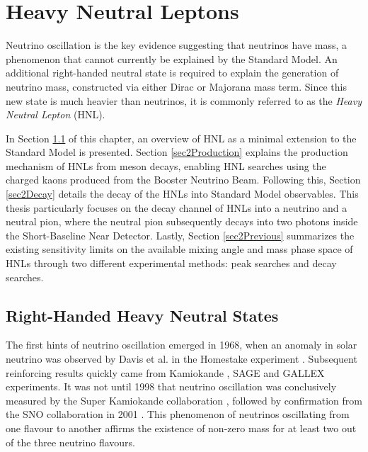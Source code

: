 
\chapter{Heavy Neutral Leptons}

\ifpdf
    \graphicspath{{Chapter2/Figs/Raster/}{Chapter2/Figs/PDF/}{Chapter2/Figs/}}
\else
    \graphicspath{{Chapter2/Figs/Vector/}{Chapter2/Figs/}}
\fi


Neutrino oscillation is the key evidence suggesting that neutrinos have mass, a phenomenon that cannot currently be explained by the Standard Model.
An additional right-handed neutral state is required to explain the generation of neutrino mass, constructed via either Dirac or Majorana mass term.
Since this new state is much heavier than neutrinos, it is commonly referred to as the \textit{Heavy Neutral Lepton} (HNL).

In Section \ref{sec2Overview} of this chapter, an overview of HNL as a minimal extension to the Standard Model is presented.
Section \ref{sec2Production} explains the production mechanism of HNLs from meson decays, enabling HNL searches using the charged kaons produced from the Booster Neutrino Beam.
Following this, Section \ref{sec2Decay} details the decay of the HNLs into Standard Model observables. 
This thesis particularly focuses on the decay channel of HNLs into a neutrino and a neutral pion, where the neutral pion subsequently decays into two photons inside the Short-Baseline Near Detector.
Lastly, Section \ref{sec2Previous} summarizes the existing sensitivity limits on the available mixing angle and mass phase space of HNLs through two different experimental methods: peak searches and decay searches.

\newpage
\section{Right-Handed Heavy Neutral States}
\label{sec2Overview}
The first hints of neutrino oscillation emerged in 1968, when an anomaly in solar neutrino was observed by Davis et al. in the Homestake experiment \cite{Homestake}.
Subsequent reinforcing results quickly came from Kamiokande \cite{Kamiokande}, SAGE \cite{SAGE} and GALLEX \cite{GALLEX} experiments.
It was not until 1998 that neutrino oscillation was conclusively measured by the Super Kamiokande collaboration \cite{superK}, followed by confirmation from the SNO collaboration in 2001 \cite{SNO}. 
This phenomenon of neutrinos oscillating from one flavour to another affirms the existence of non-zero mass for at least two out of the three neutrino flavours.


